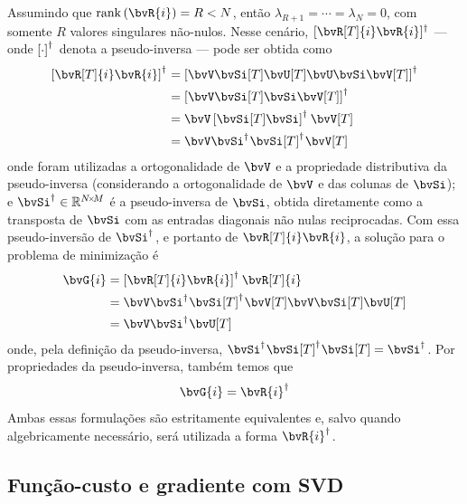 Assumindo que $\rank{\bvR{i}} = R < N$, então $\lambda_{R+1} = \cdots = \lambda_{N} = 0$, com somente $R$ valores singulares não-nulos. Nesse cenário, $\pinv{[\bvR[T]{i} \bvR{i}]}$ --- onde $\pinv*{\cdot}$ denota a pseudo-inversa --- pode ser obtida como
\begin{equation}
	\begin{split}
		\pinv*{\bvR[T]{i} \bvR{i}}
		& = \pinv*{\bvV \bvSi[T] \bvU[T] \bvU \bvSi \bvV[T]} \\
		& = \pinv*{\bvV \bvSi[T] \bvSi \bvV[T]} \\
		& = \bvV \pinv*{\bvSi[T] \bvSi} \bvV[T] \\
		& = \bvV \pinv{\bvSi} \pinv{{\bvSi[T]}} \bvV[T]
	\end{split}
\end{equation}
onde foram utilizadas a ortogonalidade de $\bvV$ e a propriedade distributiva da pseudo-inversa (considerando a ortogonalidade de $\bvV$ e das colunas de $\bvSi$); e $\pinv{\bvSi} \in\re^{\sz{N}{M}}$ é a pseudo-inversa de $\bvSi$, obtida diretamente como a transposta de $\bvSi$ com as entradas diagonais não nulas reciprocadas. Com essa pseudo-inversão de $\pinv{\bvSi}$, e portanto de $\bvR[T]{i} \bvR{i}$, a solução para o problema de minimização é
\begin{equation}
	\begin{split}
		\bvG{i}
		& = \pinv*{\bvR[T]{i} \bvR{i}} \bvR[T]{i} \\
		& = \bvV \pinv{\bvSi} \pinv{{\bvSi[T]}} \bvV[T] \bvV \bvSi[T] \bvU[T] \\
		& = \bvV \pinv{\bvSi} \bvU[T]
	\end{split}
	\label{eq:sec2:solution-G_pseudo-inverse}
\end{equation}
onde, pela definição da pseudo-inversa, $\pinv{\bvSi} \pinv{{\bvSi[T]}} \bvSi[T] = \pinv{\bvSi}$. Por propriedades da pseudo-inversa, também temos que
\begin{equation}
	\bvG{i} = \pinv{\bvR{i}}
	\label{eq:sec2:solution-G_pseudo-inverse_shortform}
\end{equation}
Ambas essas formulações são estritamente equivalentes e, salvo quando algebricamente necessário, será utilizada a forma $\pinv{\bvR{i}}$.

\subsection{Função-custo e gradiente com SVD}


